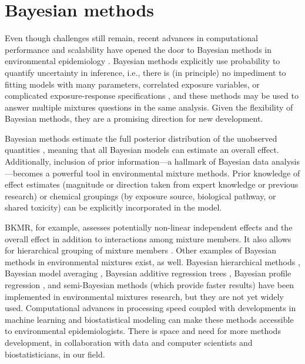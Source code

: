 \section{Bayesian methods}\label{sec:Bayes}
Even though challenges still remain, recent advances in computational performance and scalability have opened the door to Bayesian methods in environmental epidemiology \cite{hoffman2013stochastic}. Bayesian methods explicitly use probability to quantify uncertainty in inference, i.e., there is (in principle) no impediment to fitting models with many parameters, correlated exposure variables, or complicated exposure-response specifications \cite{bda3}, and these methods may be used to answer multiple mixtures questions in the same analysis. Given the flexibility of Bayesian methods, they are a promising direction for new development.

Bayesian methods estimate the full posterior distribution of the unobserved quantities \cite{bda3}, meaning that all Bayesian models can estimate an overall effect. Additionally, inclusion of prior information---a hallmark of Bayesian data analysis---becomes a powerful tool in environmental mixture methods. Prior knowledge of effect estimates (magnitude or direction taken from expert knowledge or previous research) or chemical groupings (by exposure source, biological pathway, or shared toxicity) can be explicitly incorporated in the model.

BKMR, for example, assesses potentially non-linear independent effects and the overall effect in addition to interactions among mixture members. It also allows for hierarchical grouping of mixture members \cite{bobb2014bayesian, coull2015, bobb2018statistical}. Other examples of Bayesian methods in environmental mixtures exist, as well. Bayesian hierarchical methods \cite{maclehose2007bayesian, maclehose2014applications, furlong2017prenatal}, Bayesian model averaging \cite{fragoso2018bayesian, wilson2018model, berger2018associations, berger2018prenatal, berger2018associations2}, Bayesian additive regression trees \cite{park2014environmental, chipman2010bart, ko2016classification}, Bayesian profile regression \cite{coker2018multi, coker2017association, molitor2010bayesian}, and semi-Bayesian methods (which provide faster results) \cite{mak13_org,kalkbrenner2010perinatal,momoli2010analysis} have been implemented in environmental mixtures research, but they are not yet widely used. Computational advances in processing speed coupled with developments in machine learning and biostatistical modeling can make these methods accessible to environmental epidemiologists. There is space and need for more methods development, in collaboration with data and computer scientists and biostatisticians, in our field.

